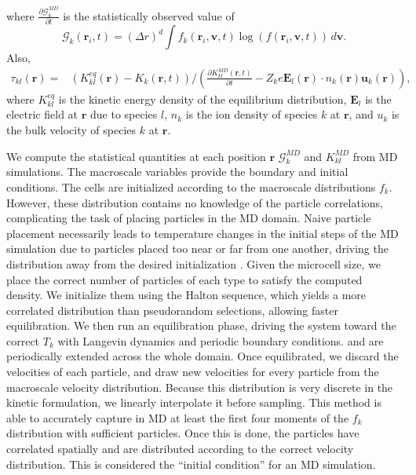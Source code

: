\documentclass{article}
\begin{document}
where $\frac{\partial \mathcal{G}_k^{MD}}{\partial t}$ is the statistically observed value of
\begin{equation}
\mathcal{G}_k(\mathbf{r}_i,t)=(\Delta r)^d\int f_k(\mathbf{r}_i,\mathbf{v},t)\log(f(\mathbf{r}_i,\mathbf{v},t))\,d\mathbf{v}. 
\end{equation}Also,
\begin{align}
 \tau_{kl}(\mathbf{r})=&\left(K_{kl}^{eq}(\mathbf{r})-K_k(\mathbf{r},t)\right)\bigg/\left(\frac{\partial K_{kl}^{MD}(\mathbf{r},t)}{\partial t}-Z_k e \mathbf{E}_l(\mathbf{r})\cdot n_k(\mathbf{r})\mathbf{u}_k(\mathbf{r})\right),\label{eq:taukl}
\end{align}
where $K_{kl}^{eq}$ is the kinetic energy density of the equilibrium distribution, $\mathbf{E}_l$ is the electric field at $\mathbf{r}$ due to species $l$, $n_k$ is the ion density of species $k$ at $\mathbf{r}$, and $u_k$ is the bulk velocity of species $k$ at $\mathbf{r}$.

We compute the statistical quantities at each position $\mathbf{r}$ $\mathcal{G}_k^{MD}$ and $K_{kl}^{MD}$ from MD simulations. The macroscale variables provide the boundary and initial conditions. The cells are initialized according to the macroscale distributions $f_k$. However, these distribution contains no knowledge of the particle correlations, complicating the task of placing particles in the MD domain. Naive particle placement necessarily leads to temperature changes in the initial steps of the MD simulation due to particles placed too near or far from one another, driving the distribution away from the desired initialization \cite{gericke2003disorder}. Given the microcell size, we place the correct number of particles of each type to satisfy the computed density. We initialize them using the Halton sequence, which yields a more correlated distribution than pseudorandom selections, allowing faster equilibration. We then run an equilibration phase, driving the system toward the correct $T_k$ with Langevin dynamics and periodic boundary conditions. and are periodically extended across the whole domain. Once equilibrated, we discard the velocities of each particle, and draw new velocities for every particle from the macroscale velocity distribution. Because this distribution is very discrete in the kinetic formulation, we linearly interpolate it before sampling. This method is able to accurately capture in MD at least the first four moments of the $f_k$ distribution with sufficient particles. Once this is done, the particles have correlated spatially and are distributed according to the correct velocity distribution. This is considered the ``initial condition'' for an MD simulation.
\end{document}

